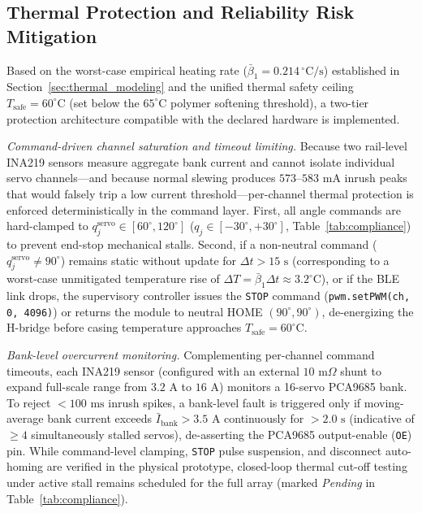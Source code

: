 \documentclass[lettersize,journal]{IEEEtran}
\begin{document}
	\subsection{Thermal Protection and Reliability Risk Mitigation}
	\label{sec:risk_mitigation}
	
	Based on the worst-case empirical heating rate ($\bar{\beta}_1 = 0.214\,^\circ\text{C/s}$) established in Section~\ref{sec:thermal_modeling} and the unified thermal safety ceiling $T_{\text{safe}} = 60^\circ\text{C}$ (set below the $65^\circ\text{C}$ polymer softening threshold), a two-tier protection architecture compatible with the declared hardware is implemented.
	
	\textit{Command-driven channel saturation and timeout limiting.} Because two rail-level INA219 sensors measure aggregate bank current and cannot isolate individual servo channels—and because normal slewing produces $573\text{--}583\text{ mA}$ inrush peaks that would falsely trip a low current threshold—per-channel thermal protection is enforced deterministically in the command layer. First, all angle commands are hard-clamped to $q_j^{\text{servo}} \in [60^\circ, 120^\circ]$ ($q_j \in [-30^\circ, +30^\circ]$, Table~\ref{tab:compliance}) to prevent end-stop mechanical stalls. Second, if a non-neutral command ($q_j^{\text{servo}} \neq 90^\circ$) remains static without update for $\Delta t > 15\text{ s}$ (corresponding to a worst-case unmitigated temperature rise of $\Delta T = \bar{\beta}_1 \Delta t \approx 3.2^\circ\text{C}$), or if the BLE link drops, the supervisory controller issues the \texttt{STOP} command (\texttt{pwm.setPWM(ch, 0, 4096)}) or returns the module to neutral HOME $(90^\circ, 90^\circ)$, de-energizing the H-bridge before casing temperature approaches $T_{\text{safe}} = 60^\circ\text{C}$.
	
	\textit{Bank-level overcurrent monitoring.} Complementing per-channel command timeouts, each INA219 sensor (configured with an external $10\text{ m}\Omega$ shunt to expand full-scale range from $3.2\text{ A}$ to $16\text{ A}$) monitors a 16-servo PCA9685 bank. To reject $< 100\text{ ms}$ inrush spikes, a bank-level fault is triggered only if moving-average bank current exceeds $\bar{I}_{\text{bank}} > 3.5\text{ A}$ continuously for $> 2.0\text{ s}$ (indicative of $\ge 4$ simultaneously stalled servos), de-asserting the PCA9685 output-enable (\texttt{OE}) pin. While command-level clamping, \texttt{STOP} pulse suspension, and disconnect auto-homing are verified in the physical prototype, closed-loop thermal cut-off testing under active stall remains scheduled for the full array (marked \textit{Pending} in Table~\ref{tab:compliance}).
	
\end{document}
